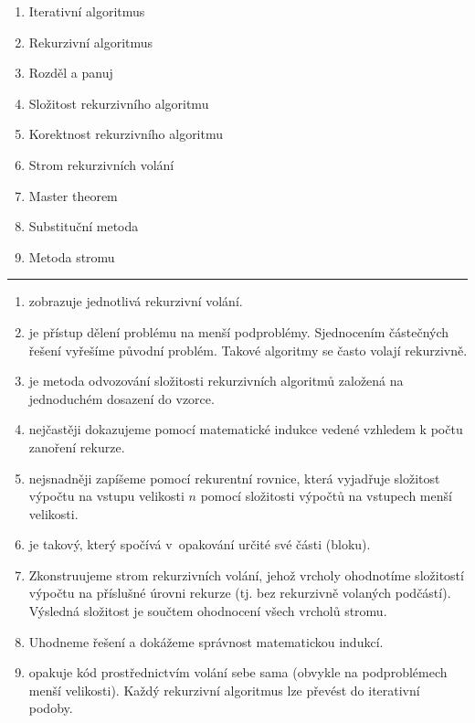 \documentclass[12pt,a4paper,landscape]{article}
\begin{document}
\pagestyle{empty}

\setlength{\parindent}{0pt}
\setlength{\columnsep}{20pt}

\Large

\begin{multicols}{2}
\begin{enumerate}
\item Iterativní algoritmus
\item Rekurzivní algoritmus
\item Rozděl a panuj
\item Složitost rekurzivního algoritmu
\item Korektnost rekurzivního algoritmu
\item Strom rekurzivních volání
\item Master theorem
\item Substituční metoda
\item Metoda stromu
\end{enumerate}
\end{multicols}

\rule{\linewidth}{1pt}

\begin{multicols}{2}
\begin{enumerate}[label=\Alph*.]

\item zobrazuje jednotlivá rekurzivní volání.

\item je přístup dělení problému na menší podproblémy.
Sjednocením částečných řešení vyřešíme původní problém. Takové
algoritmy se často volají rekurzivně.
\item je metoda odvozování složitosti rekurzivních algoritmů založená na
jednoduchém dosazení do vzorce.
\item nejčastěji dokazujeme pomocí matematické indukce vedené vzhledem k počtu
zanoření rekurze.
\item nejsnadněji zapíšeme pomocí rekurentní rovnice, která vyjadřuje složitost
výpočtu na vstupu velikosti $n$ pomocí složitosti výpočtů na vstupech menší
velikosti.
\item je takový, který spočívá v~opakování určité své části (bloku).
\item Zkonstruujeme strom rekurzivních volání, jehož vrcholy ohodnotíme složitostí
výpočtu na příslušné úrovni rekurze (tj. bez rekurzivně volaných podčástí).
Výsledná složitost je součtem ohodnocení všech vrcholů stromu.
\item Uhodneme řešení a dokážeme správnost matematickou indukcí.
\item opakuje kód prostřednictvím volání sebe sama (obvykle na podproblémech menší
velikosti). Každý rekurzivní algoritmus lze převést do iterativní podoby.
\end{enumerate}

\end{multicols}
\end{document}
